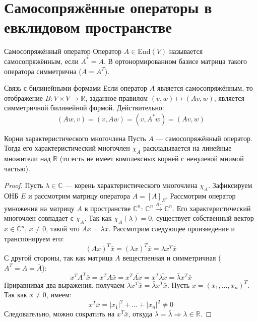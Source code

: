 \section{Самосопряжённые операторы в евклидовом пространстве}

\begin{Definition}{Самосопряжённый оператор}{}
	Оператор $A \in \mathrm{End}(V)$ называется самосопряжённым, если $A^* = A$.
	В ортонормированном базисе матрица такого оператора симметрична ($A = A^T$).
\end{Definition}

\begin{Remark}{Связь с билинейными формами}{}
	Если оператор $A$ является самосопряжённым, то отображение $B: V \times V \to \mathbb{R}$, заданное правилом $(v, w) \mapsto (Av, w)$, является симметричной билинейной формой.
	Действительно:
	\[
	(Aw, v) = (v, Aw) = (v, A^* w) = (Av, w)
	\] 
\end{Remark}

\begin{Proposition}{Корни характеристического многочлена}{}
	Пусть $A$ — самосопряжённый оператор.
	Тогда его характеристический многочлен $\chi_A$ раскладывается на линейные множители над $\mathbb{R}$ (то есть не имеет комплексных корней с ненулевой мнимой частью).
\end{Proposition}

\begin{proof}
	Пусть $\lambda \in \mathbb{C}$ — корень характеристического многочлена $\chi_A$. Зафиксируем ОНБ $E$ и рассмотрим матрицу оператора $A = [A]_E$.
	Рассмотрим оператор умножения на матрицу $A$ в пространстве $\mathbb{C}^n$: $\mathbb{C}^n \xrightarrow{A \cdot} \mathbb{C}^n$. Его характеристический многочлен совпадает с $\chi_A$.
	Так как $\chi_A(\lambda) = 0$, существует собственный вектор $x \in \mathbb{C}^n$, $x \neq 0$, такой что $Ax = \lambda x$.
	Рассмотрим следующее произведение и транспонируем его:
	\[
	(Ax)^T \bar{x} = (\lambda x)^T \bar{x} = \lambda x^T \bar{x}
	\] 
	С другой стороны, так как матрица $A$ вещественная и симметричная ($A^T = A = \bar{A}$):
	\[
	x^T A^T \bar{x} = x^T A \bar{x} = x^T \overline{A x} = x^T \overline{\lambda x} = \bar{\lambda} x^T \bar{x}
	\] 
	Приравнивая два выражения, получаем $\lambda x^T \bar{x} = \bar{\lambda} x^T \bar{x}$.
	Пусть $x = (x_1, \dots, x_n)^T$. Так как $x \neq 0$, имеем:
	\[
	x^T \bar{x} = |x_1|^2 + \dots + |x_n|^2 \neq 0
	\] 
	Следовательно, можно сократить на $x^T \bar{x}$, откуда $\lambda = \bar{\lambda} \Rightarrow \lambda \in \mathbb{R}$.
\end{proof}

